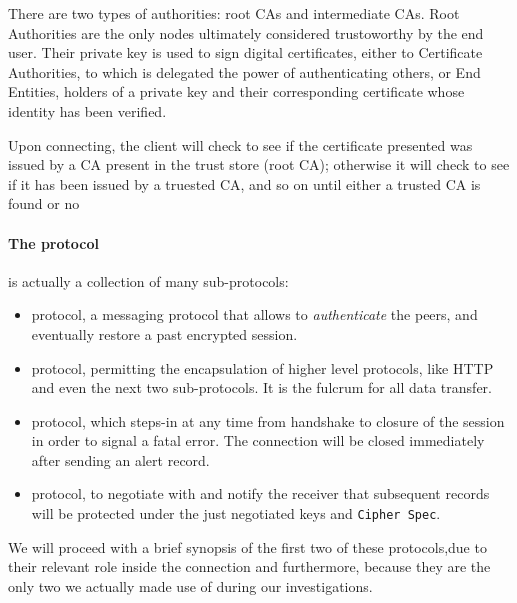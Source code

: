 There are two types of authorities: root CAs and intermediate CAs. Root
Authorities are the only nodes ultimately considered trustoworthy by the end
user. Their private key is used to sign digital certificates, either to
Certificate Authorities, to which is delegated the power of authenticating
others, or End Entities, holders of a private key and their corresponding
certificate whose identity has been verified.

Upon connecting, the client will check to see if the certificate presented was issued
by a CA present in the trust store (root CA); otherwise it will check to see if
it has been issued by a truested CA, and so on until either a trusted CA is
found or no

\paragraph{The protocol} is actually a collection of many sub-protocols:
\begin{itemize}
  \setlength{\itemsep}{1pt}
  \setlength{\parskip}{0pt}
  \setlength{\parsep}{0pt}
\item {} protocol, a messaging protocol that allows to
  \emph{authenticate} the peers, and eventually restore a past encrypted
  session.
\item {} protocol, permitting the encapsulation of higher level protocols,
  like HTTP and even the next two sub-protocols. It is the fulcrum for all data
  transfer.
\item {} protocol, which steps-in at any time from handshake to closure of the
  session in order to signal a fatal error. The connection will be closed
  immediately after sending an alert record.
\item {} protocol, to negotiate with and notify  the receiver that
  subsequent records will be protected under the just negotiated keys and
  \texttt{Cipher Spec}.
\end{itemize}
We will proceed with a brief synopsis of the first two of these protocols,due to
their relevant role inside the connection and furthermore, because they are the
only two we actually made use of during our investigations.



